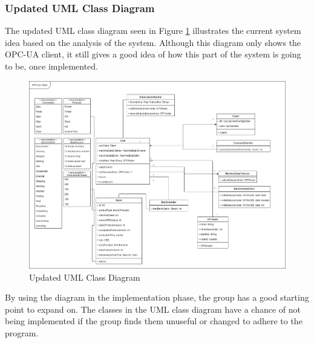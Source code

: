 \subsubsection{Updated UML Class Diagram}
The updated UML class diagram seen in Figure
\ref{figure:updated_UML_class_diagram} illustrates the current system idea based
on the analysis of the system. Although this diagram only shows the 
OPC-UA client, it still gives a good idea of how this part of the system is going
to be, once implemented.

\begin{figure}[ht]
\centering 
\includegraphics[width=1\textwidth]{images/diagrams/updated_UML_Class_Diagram.drawio.png}
\caption{Updated UML Class Diagram}
\label{figure:updated_UML_class_diagram} 
\end{figure}

By using the diagram in the implementation phase, the group has a good starting 
point to expand on. The classes in the UML class diagram have a chance of not 
being implemented if the group finds them unuseful or changed to adhere to the 
program.
